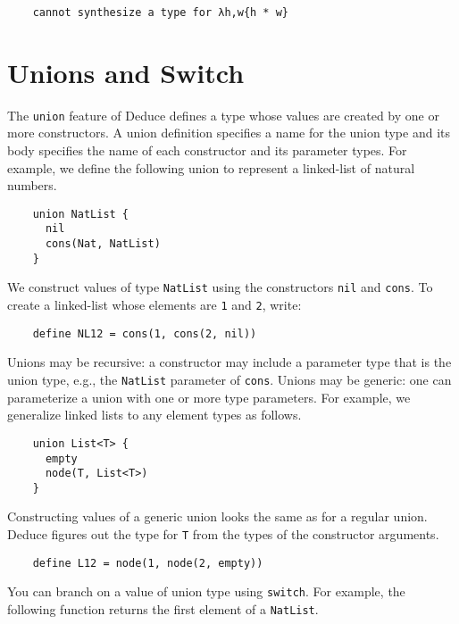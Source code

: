 \documentclass[12pt]{article}
\begin{document}
\begin{verbatim}
    cannot synthesize a type for λh,w{h * w}
\end{verbatim}

\section{Unions and Switch}
\label{sec:union}

The \texttt{union} feature of Deduce defines a type whose values are
created by one or more constructors.  A union definition specifies a
name for the union type and its body specifies the name of each
constructor and its parameter types. For example, we define the
following union to represent a linked-list of natural numbers.

\begin{verbatim}
    union NatList {
      nil
      cons(Nat, NatList)
    }
\end{verbatim}

We construct values of type \texttt{NatList} using the constructors
\texttt{nil} and \texttt{cons}. To create a linked-list whose elements
are \texttt{1} and \texttt{2}, write:

\begin{verbatim}
    define NL12 = cons(1, cons(2, nil))
\end{verbatim}

Unions may be recursive: a constructor may include a parameter type
that is the union type, e.g., the \texttt{NatList} parameter of
\texttt{cons}. Unions may be generic: one can parameterize a union
with one or more type parameters. For example, we generalize linked
lists to any element types as follows.

\begin{verbatim}
    union List<T> {
      empty
      node(T, List<T>)
    }
\end{verbatim}

Constructing values of a generic union looks the same as for a regular
union. Deduce figures out the type for \texttt{T} from the types of
the constructor arguments.

\begin{verbatim}
    define L12 = node(1, node(2, empty))
\end{verbatim}

\pagebreak

You can branch on a value of union type using \texttt{switch}. For
example, the following function returns the first element of a
\texttt{NatList}.
\end{document}
